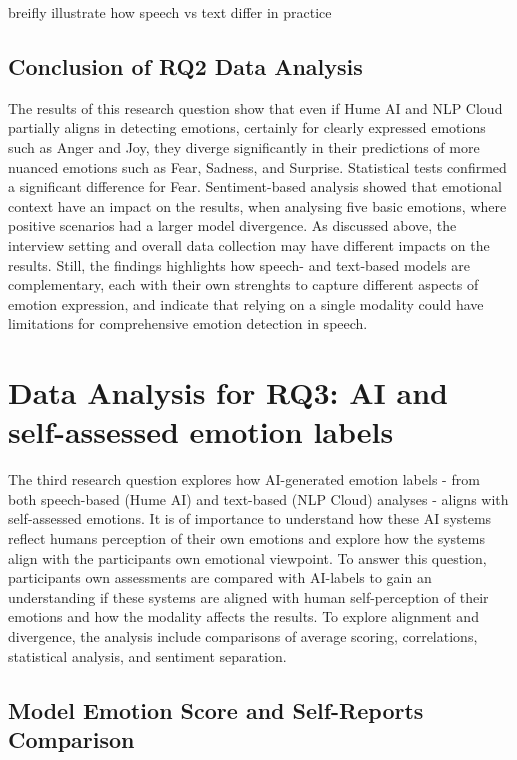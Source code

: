 breifly illustrate how speech vs text differ in practice 

\subsection{Conclusion of RQ2 Data Analysis}
The results of this research question show that even if Hume AI and NLP Cloud partially aligns in detecting emotions, certainly for clearly expressed emotions such as Anger and Joy, 
they diverge significantly in their predictions of more nuanced emotions such as Fear, Sadness, and Surprise. Statistical tests confirmed a significant difference for Fear. 
Sentiment-based analysis showed that emotional context have an impact on the results, when analysing five basic emotions, where positive scenarios had a larger model divergence. 
As discussed above, the interview setting and overall data collection may have different impacts on the results. Still, the findings highlights how speech- and text-based models are complementary, each 
with their own strenghts to capture different aspects of emotion expression, and indicate that relying on a single modality could have limitations for comprehensive emotion detection in speech.  


\section{Data Analysis for RQ3: AI and self-assessed emotion labels}

The third research question explores how AI-generated emotion labels - from both speech-based (Hume AI) and text-based (NLP Cloud) 
analyses - aligns with self-assessed emotions. It is of importance to understand how these AI systems reflect humans perception of 
their own emotions and explore how the systems align with the participants own emotional viewpoint.  
To answer this question, participants own assessments are compared with AI-labels to gain an understanding if these systems are aligned with human self-perception of their emotions and how the modality affects the results. 
To explore alignment and divergence, the analysis include comparisons of average scoring, correlations, statistical analysis, and sentiment separation.  
\subsection{Model Emotion Score and Self-Reports Comparison}

